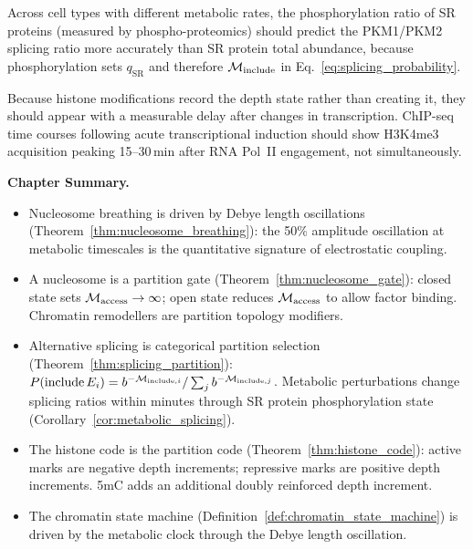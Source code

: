\begin{proposition}
\label{prop:SR_splicing}
Across cell types with different metabolic rates, the phosphorylation ratio of
SR proteins (measured by phospho-proteomics) should predict the PKM1/PKM2
splicing ratio more accurately than SR protein total abundance, because
phosphorylation sets $q_{\mathrm{SR}}$ and therefore $\mathcal{M}_{\mathrm{include}}$
in Eq.~\eqref{eq:splicing_probability}.
\end{proposition}

\begin{proposition}
\label{prop:histone_writing_delay}
Because histone modifications record the depth state rather than creating it,
they should appear with a measurable delay after changes in transcription.
ChIP-seq time courses following acute transcriptional induction should show
H3K4me3 acquisition peaking 15--30\,min after RNA Pol~II engagement, not
simultaneously.
\end{proposition}

\begin{chapterbox}
\textbf{Chapter Summary.}
\begin{itemize}
  \item Nucleosome breathing is driven by Debye length oscillations
        (Theorem~\ref{thm:nucleosome_breathing}): the 50\% amplitude
        oscillation at metabolic timescales is the quantitative signature of
        electrostatic coupling.
  \item A nucleosome is a partition gate (Theorem~\ref{thm:nucleosome_gate}):
        closed state sets $\mathcal{M}_{\mathrm{access}} \to \infty$; open state
        reduces $\mathcal{M}_{\mathrm{access}}$ to allow factor binding.
        Chromatin remodellers are partition topology modifiers.
  \item Alternative splicing is categorical partition selection
        (Theorem~\ref{thm:splicing_partition}):
        $P(\text{include}\,E_i) = b^{-\mathcal{M}_{\mathrm{include},i}}/
        \sum_j b^{-\mathcal{M}_{\mathrm{include},j}}$.
        Metabolic perturbations change splicing ratios within minutes through
        SR protein phosphorylation state (Corollary~\ref{cor:metabolic_splicing}).
  \item The histone code is the partition code
        (Theorem~\ref{thm:histone_code}): active marks are negative depth
        increments; repressive marks are positive depth increments.
        5mC adds an additional doubly reinforced depth increment.
  \item The chromatin state machine
        (Definition~\ref{def:chromatin_state_machine}) is driven by the
        metabolic clock through the Debye length oscillation.
\end{itemize}
\end{chapterbox}
